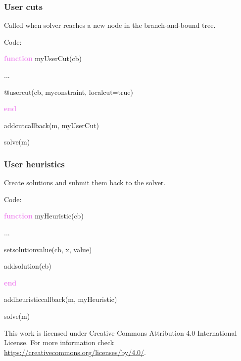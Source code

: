 \documentclass{beamer}
\begin{document}
\begin{frame}
  \frametitle{User cuts}
  Called when solver reaches a new node in the branch-and-bound tree.

  \begin{block}{Code:}\footnotesize
    
    \textcolor{violet}{\textbf{function}} myUserCut(cb)
    
    \hspace{1cm}    ...
    
    \hspace{1cm}    @usercut(cb, myconstraint, localcut=true)

    \textcolor{violet}{\bf end}
    
    addcutcallback(m, myUserCut)

    solve(m)
  \end{block}
  
\end{frame}


\begin{frame}
  \frametitle{User heuristics}

  Create solutions and submit them back to the solver.

  \begin{block}{Code:}\footnotesize
    
    \textcolor{violet}{\textbf{function}} myHeuristic(cb)
    
    \hspace{1cm}    ...
    
    \hspace{1cm}    setsolutionvalue(cb, x, value)
    
    \hspace{1cm}    addsolution(cb)

    \textcolor{violet}{\bf end}
    
    addheuristiccallback(m, myHeuristic)

    solve(m)
  \end{block}

\end{frame}


\begin{frame}
  \vfill
  \centering
  This work is licensed under Creative Commons Attribution 4.0 International License.
  For more information check \url{https://creativecommons.org/licenses/by/4.0/}.
  \vfill
\end{frame}
\end{document}
